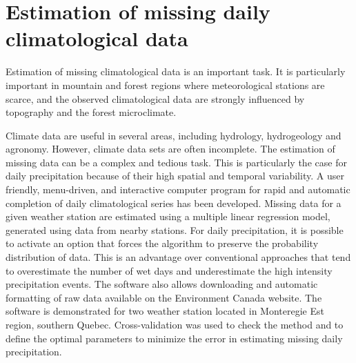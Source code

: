 \documentclass[WHATMANUAL.tex]{subfiles}
\begin{document}
\chapter{Estimation of missing daily climatological data}

Estimation of missing climatological data is an important task. It is particularly important in mountain and forest regions where meteorological stations are scarce, and the observed climatological data are strongly influenced by topography and the forest microclimate.

Climate data are useful in several areas, including hydrology, hydrogeology and agronomy. However, climate data sets are often incomplete. The estimation of missing data can be a complex and tedious task. This is particularly the case for daily precipitation because of their high spatial and temporal variability. A user friendly, menu-driven, and interactive computer program for rapid and automatic completion of daily climatological series has been developed. Missing data for a given weather station are estimated using a multiple linear regression model, generated using data from nearby stations. For daily precipitation, it is possible to activate an option that forces the algorithm to preserve the probability distribution of data. This is an advantage over conventional approaches that tend to overestimate the number of wet days and underestimate the high intensity precipitation events. The software also allows downloading and automatic formatting of raw data available on the Environment Canada website. The software is demonstrated for two weather station located in Monteregie Est region, southern Quebec. Cross-validation was used to check the method and to define the optimal parameters to minimize the error in estimating missing daily precipitation.
\end{document}
